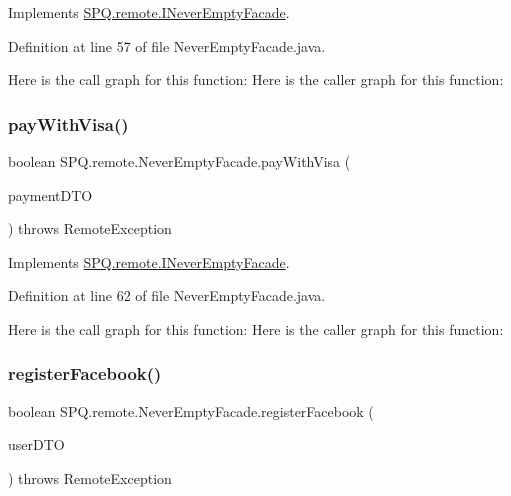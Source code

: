 Implements \mbox{\hyperlink{interface_s_p_q_1_1remote_1_1_i_never_empty_facade_a2d34c64f91537d8c7138094e418de785}{S\+P\+Q.\+remote.\+I\+Never\+Empty\+Facade}}.



Definition at line 57 of file Never\+Empty\+Facade.\+java.

Here is the call graph for this function\+:
Here is the caller graph for this function\+:
\mbox{\label{class_s_p_q_1_1remote_1_1_never_empty_facade_a0ff9201cf33cb76c43dd85c892af93ba}} 
\subsubsection{\texorpdfstring{pay\+With\+Visa()}{payWithVisa()}}
{\footnotesize\ttfamily boolean S\+P\+Q.\+remote.\+Never\+Empty\+Facade.\+pay\+With\+Visa (\begin{DoxyParamCaption}\item[{\mbox{\hyperlink{class_s_p_q_1_1dto_1_1_payment_d_t_o}{Payment\+D\+TO}}}]{payment\+D\+TO }\end{DoxyParamCaption}) throws Remote\+Exception}



Implements \mbox{\hyperlink{interface_s_p_q_1_1remote_1_1_i_never_empty_facade_a3b7058d95e7b73bdcc09220ecfc2d744}{S\+P\+Q.\+remote.\+I\+Never\+Empty\+Facade}}.



Definition at line 62 of file Never\+Empty\+Facade.\+java.

Here is the call graph for this function\+:
Here is the caller graph for this function\+:
\mbox{\label{class_s_p_q_1_1remote_1_1_never_empty_facade_aa9845001ecd5228135d64415a4c12b20}} 
\subsubsection{\texorpdfstring{register\+Facebook()}{registerFacebook()}}
{\footnotesize\ttfamily boolean S\+P\+Q.\+remote.\+Never\+Empty\+Facade.\+register\+Facebook (\begin{DoxyParamCaption}\item[{\mbox{\hyperlink{class_s_p_q_1_1dto_1_1_user_d_t_o}{User\+D\+TO}}}]{user\+D\+TO }\end{DoxyParamCaption}) throws Remote\+Exception}



